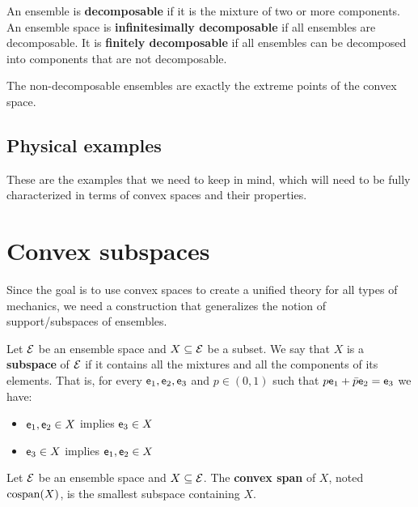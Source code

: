 \begin{defn}
	An ensemble is \textbf{decomposable} if it is the mixture of two or more components. An ensemble space is \textbf{infinitesimally decomposable} if all ensembles are decomposable. It is \textbf{finitely decomposable} if all ensembles can be decomposed into components that are not decomposable.
\end{defn}

\begin{remark}
	The non-decomposable ensembles are exactly the extreme points of the convex space.
\end{remark}



\subsection{Physical examples}

These are the examples that we need to keep in mind, which will need to be fully characterized in terms of convex spaces and their properties.


\section{Convex subspaces}

Since the goal is to use convex spaces to create a unified theory for all types of mechanics, we need a construction that generalizes the notion of support/subspaces of ensembles.

\begin{defn}
	Let $\mathcal{E}$ be an ensemble space and $X \subseteq \mathcal{E}$ be a subset. We say that $X$ is a \textbf{subspace} of $\mathcal{E}$ if it contains all the mixtures and all the components of its elements. That is, for every $\mathsf{e}_1, \mathsf{e}_2, \mathsf{e}_3$ and $p \in (0,1)$ such that $p\mathsf{e}_1 + \bar{p} \mathsf{e}_2 = \mathsf{e}_3$ we have:
	\begin{itemize}
	\item $\mathsf{e}_1, \mathsf{e}_2 \in X$ implies $\mathsf{e}_3 \in X$
	\item $\mathsf{e}_3 \in X$ implies $\mathsf{e}_1, \mathsf{e}_2 \in X$
\end{itemize}
\end{defn}

\begin{defn}
	Let $\mathcal{E}$ be an ensemble space and $X \subseteq \mathcal{E}$.  The \textbf{convex span} of $X$, noted $\mathrm{cospan}(X)$, is the smallest subspace containing $X$.
\end{defn}

